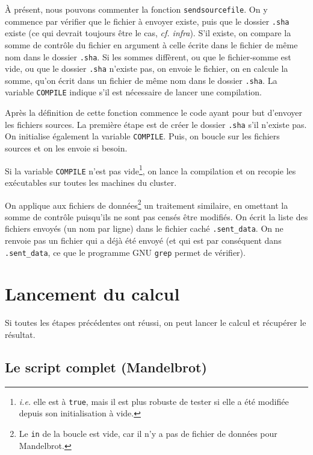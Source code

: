 À présent, nous pouvons commenter la fonction
\texttt{sendsourcefile}. On y commence par vérifier que le fichier à
envoyer existe, puis que le dossier \texttt{.sha} existe (ce qui
devrait toujours être le cas, \emph{cf. infra}). S'il existe, on
compare la somme de contrôle du fichier en argument à celle écrite
dans le fichier de même nom dans le dossier \texttt{.sha}. Si les
sommes diffèrent, ou que le fichier-somme est vide, ou que le dossier
\texttt{.sha} n'existe pas, on envoie le fichier, on en calcule la
somme, qu'on écrit dans un fichier de même nom dans le dossier
\texttt{.sha}. La variable \texttt{COMPILE} indique s'il est
nécessaire de lancer une compilation.

Après la définition de cette fonction commence le code ayant pour but
d'envoyer les fichiers sources. La première étape est de créer le
dossier \texttt{.sha} s'il n'existe pas. On initialise également la
variable \texttt{COMPILE}. Puis, on boucle sur les fichiers sources et
on les envoie si besoin.

Si la variable \texttt{COMPILE} n'est pas vide\footnote{\emph{i.e.}
  elle est à \texttt{true}, mais il est plus robuste de tester si elle
  a été modifiée depuis son initialisation à vide.}, on lance la
compilation et on recopie les exécutables sur toutes les machines du
cluster.

On applique aux fichiers de données\footnote{Le \texttt{in} de la
  boucle est vide, car il n'y a pas de fichier de données pour
  Mandelbrot.} un traitement similaire, en omettant la somme de
contrôle puisqu'ils ne sont pas censés être modifiés. On écrit la
liste des fichiers envoyés (un nom par ligne) dans le fichier caché
\texttt{.sent\_data}. On ne renvoie pas un fichier qui a déjà été
envoyé (et qui est par conséquent dans \texttt{.sent\_data}, ce que le
programme GNU \texttt{grep} permet de vérifier).


\section{Lancement du calcul}

Si toutes les étapes précédentes ont réussi, on peut lancer le calcul
et récupérer le résultat.

\clearpage

\begin{onecolumn}
  \section{Le script complet (Mandelbrot)}

  
\end{onecolumn}

\clearpage
\twocolumn



